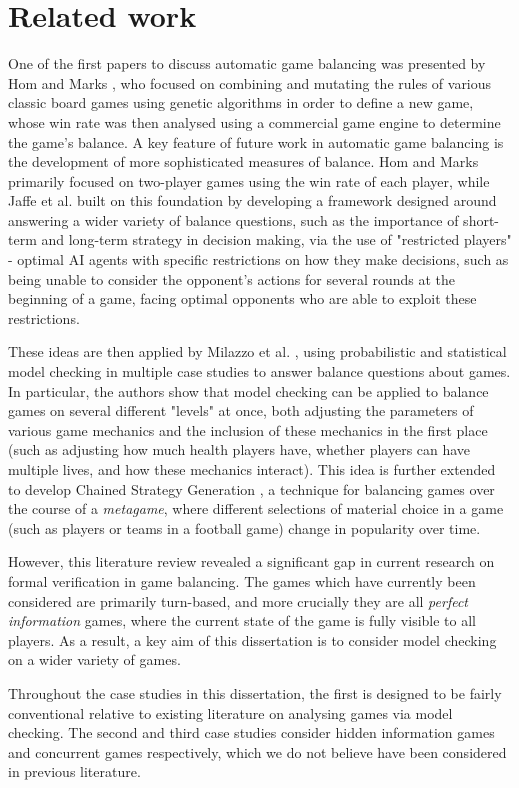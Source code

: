 \section{Related work}


\label{back:related}

One of the first papers to discuss automatic game balancing was presented by Hom and Marks \cite{hom_automatic_2007}, who focused on combining and mutating the rules of various classic board games using genetic algorithms in order to define a new game, whose win rate was then analysed using a commercial game engine to determine the game's balance. A key feature of future work in automatic game balancing is the development of more sophisticated measures of balance. Hom and Marks primarily focused on two-player games using the win rate of each player, while Jaffe et al. \cite{jaffe_evaluating_2012} built on this foundation by developing a framework designed around answering a wider variety of balance questions, such as the importance of short-term and long-term strategy in decision making, via the use of "restricted players" - optimal AI agents with specific restrictions on how they make decisions, such as being unable to consider the opponent's actions for several rounds at the beginning of a game, facing optimal opponents who are able to exploit these restrictions.

These ideas are then applied by Milazzo et al. \cite{milazzo_case_2015}, using probabilistic and statistical model checking in multiple case studies to answer balance questions about games. In particular, the authors show that model checking can be applied to balance games on several different "levels" at once, both adjusting the parameters of various game mechanics and the inclusion of these mechanics in the first place (such as adjusting how much health players have, whether players can have multiple lives, and how these mechanics interact). This idea is further extended to develop Chained Strategy Generation \cite{kavanagh_balancing_2019}, a technique for balancing games over the course of a \emph{metagame}, where different selections of material choice in a game (such as players or teams in a football game) change in popularity over time.

However, this literature review revealed a significant gap in current research on formal verification in game balancing. The games which have currently been considered are primarily turn-based, and more crucially they are all \emph{perfect information} games, where the current state of the game is fully visible to all players. As a result, a key aim of this dissertation is to consider model checking on a wider variety of games.

Throughout the case studies in this dissertation, the first is designed to be fairly conventional relative to existing literature on analysing games via model checking. The second and third case studies consider hidden information games and concurrent games respectively, which we do not believe have been considered in previous literature.
